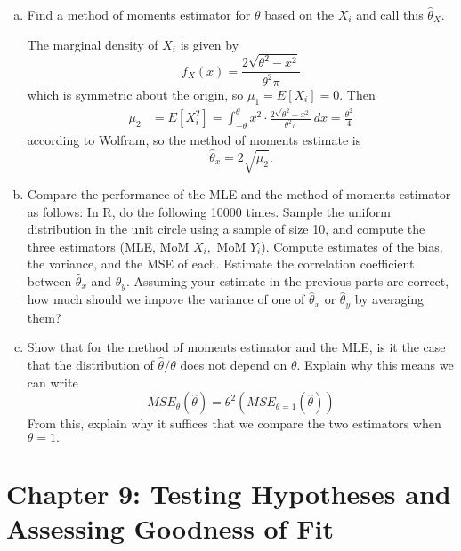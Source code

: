 \documentclass{article}
\begin{document}
\begin{enumerate}
\begin{enumerate}[(a)]
\begin{soln}
				\end{soln}

			\item Find a method of moments estimator for $\theta$ based on the $X_i$ and call this $\hat{\theta}_X.$
				\begin{soln}
					The marginal density of $X_i$ is given by \[f_X(x)=\frac{2\sqrt{\theta^2-x^2}}{\theta^2\pi}\] which is symmetric about the origin, so $\mu_1=E[X_i]=0.$ Then
					\begin{align*}
						\mu_2 &= E[X_i^2] = \int_{-\theta}^\theta x^2\cdot\frac{2\sqrt{\theta^2-x^2}}{\theta^2\pi}\, dx = \frac{\theta^2}{4}
					\end{align*} according to Wolfram, so the method of moments estimate is \[\hat{\theta}_x=2\sqrt{\hat{\mu}_2}.\] 
				\end{soln}

			\item Compare the performance of the MLE and the method of moments estimator as follows: In R, do the following 10000 times. Sample the uniform distribution in the unit circle using a sample of size 10, and compute the three estimators (MLE, MoM $X_i,$ MoM $Y_i$). Compute estimates of the bias, the variance, and the MSE of each. Estimate the correlation coefficient between $\hat{\theta}_x$ and $\hat{\theta}_y.$ Assuming your estimate in the previous parts are correct, how much should we impove the variance of one of $\hat{\theta}_x$ or $\hat{\theta}_y$ by averaging them?

			\item Show that for the method of moments estimator and the MLE, is it the case that the distribution of $\hat{\theta}/\theta$ does not depend on $\theta.$ Explain why this means we can write \[MSE_\theta(\hat{\theta})=\theta^2\left( MSE_{\theta=1}(\hat{\theta}) \right)\] From this, explain why it suffices that we compare the two estimators when $\theta=1.$
				
		\end{enumerate}
		
\end{enumerate}

\section*{Chapter 9: Testing Hypotheses and Assessing Goodness of Fit}
\end{document}
